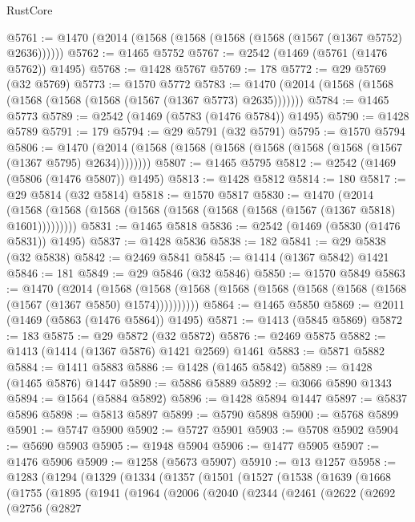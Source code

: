 \begin{lexlean}{RustCore}
\begin{coremodule}
@5761 := @1470 (@2014 (@1568 (@1568 (@1568 (@1568 (@1567 (@1367 @5752) @2636))))))
@5762 := @1465 @5752
@5767 := @2542 (@1469 (@5761 (@1476 @5762)) @1495)
@5768 := @1428 @5767
@5769 := 178
@5772 := @29 @5769 (@32 @5769)
@5773 := @1570 @5772
@5783 := @1470 (@2014 (@1568 (@1568 (@1568 (@1568 (@1568 (@1567 (@1367 @5773) @2635)))))))
@5784 := @1465 @5773
@5789 := @2542 (@1469 (@5783 (@1476 @5784)) @1495)
@5790 := @1428 @5789
@5791 := 179
@5794 := @29 @5791 (@32 @5791)
@5795 := @1570 @5794
@5806 := @1470 (@2014 (@1568 (@1568 (@1568 (@1568 (@1568 (@1568 (@1567 (@1367 @5795) @2634))))))))
@5807 := @1465 @5795
@5812 := @2542 (@1469 (@5806 (@1476 @5807)) @1495)
@5813 := @1428 @5812
@5814 := 180
@5817 := @29 @5814 (@32 @5814)
@5818 := @1570 @5817
@5830 := @1470
    (@2014 (@1568 (@1568 (@1568 (@1568 (@1568 (@1568 (@1568 (@1567 (@1367 @5818) @1601)))))))))
@5831 := @1465 @5818
@5836 := @2542 (@1469 (@5830 (@1476 @5831)) @1495)
@5837 := @1428 @5836
@5838 := 182
@5841 := @29 @5838 (@32 @5838)
@5842 := @2469 @5841
@5845 := @1414 (@1367 @5842) @1421
@5846 := 181
@5849 := @29 @5846 (@32 @5846)
@5850 := @1570 @5849
@5863 := @1470
    (@2014
      (@1568 (@1568 (@1568 (@1568 (@1568 (@1568 (@1568 (@1568 (@1567 (@1367 @5850) @1574))))))))))
@5864 := @1465 @5850
@5869 := @2011 (@1469 (@5863 (@1476 @5864)) @1495)
@5871 := @1413 (@5845 @5869)
@5872 := 183
@5875 := @29 @5872 (@32 @5872)
@5876 := @2469 @5875
@5882 := @1413 (@1414 (@1367 @5876) @1421 @2569) @1461
@5883 := @5871 @5882
@5884 := @1411 @5883
@5886 := @1428 (@1465 @5842)
@5889 := @1428 (@1465 @5876) @1447
@5890 := @5886 @5889
@5892 := @3066 @5890 @1343
@5894 := @1564 (@5884 @5892)
@5896 := @1428 @5894 @1447
@5897 := @5837 @5896
@5898 := @5813 @5897
@5899 := @5790 @5898
@5900 := @5768 @5899
@5901 := @5747 @5900
@5902 := @5727 @5901
@5903 := @5708 @5902
@5904 := @5690 @5903
@5905 := @1948 @5904
@5906 := @1477 @5905
@5907 := @1476 @5906
@5909 := @1258 (@5673 @5907)
@5910 := @13 @1257
@5958 := @1283
    (@1294
      (@1329
        (@1334
          (@1357
            (@1501
              (@1527
                (@1538
                  (@1639
                    (@1668
                      (@1755
                        (@1895
                          (@1941
                            (@1964
                              (@2006
                                (@2040
                                  (@2344
                                    (@2461
                                      (@2622
                                        (@2692
                                          (@2756
                                            (@2827

\end{coremodule}
\end{lexlean}
